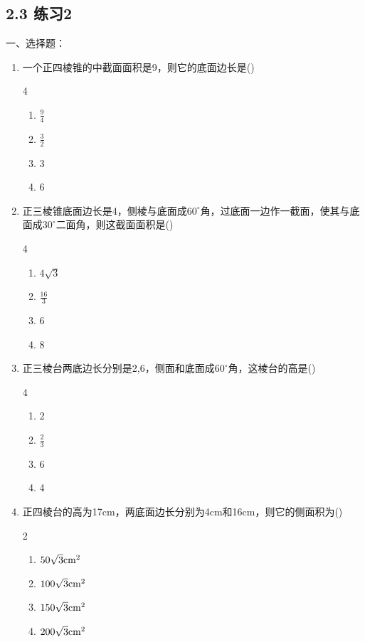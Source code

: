 \subsection*{2.3 练习2}
一、选择题：
\begin{enumerate}
\item 一个正四棱锥的中截面面积是9，则它的底面边长是\hfill (\qquad )
\begin{multicols}{4}
\begin{enumerate}[(1)]
    \item $\frac{9}{4}$
    \item $\frac{3}{2}$
    \item 3
    \item 6
\end{enumerate}
\end{multicols}

\item 正三棱锥底面边长是4，侧棱与底面成$60^{\circ}$角，过底面一边作一截面，使其与底面成$30^{\circ}$二面角，则这截面面积是\hfill (\qquad )
\begin{multicols}{4}
    \begin{enumerate}[(1)]
        \item $4\sqrt{3}$
        \item $\frac{16}{3}$
        \item 6
        \item 8
    \end{enumerate}
    \end{multicols}
\item 正三棱台两底边长分别是2,6，侧面和底面成$60^{\circ}$角，这棱台的高是\hfill (\qquad )
\begin{multicols}{4}
    \begin{enumerate}[(1)]
        \item 2
        \item $\frac{2}{3}$
        \item 6
        \item 4
    \end{enumerate}
    \end{multicols}

    \item 正四棱台的高为17cm，两底面边长分别为4cm和16cm，则它的侧面积为\hfill (\qquad )
\begin{multicols}{2}
    \begin{enumerate}[(1)]
        \item $50\sqrt{3}{\rm cm^2}$
        \item $100\sqrt{3}{\rm cm^2}$
        \item $150\sqrt{3}{\rm cm^2}$
        \item $200\sqrt{3}{\rm cm^2}$
    \end{enumerate}
    \end{multicols}


\end{enumerate}
